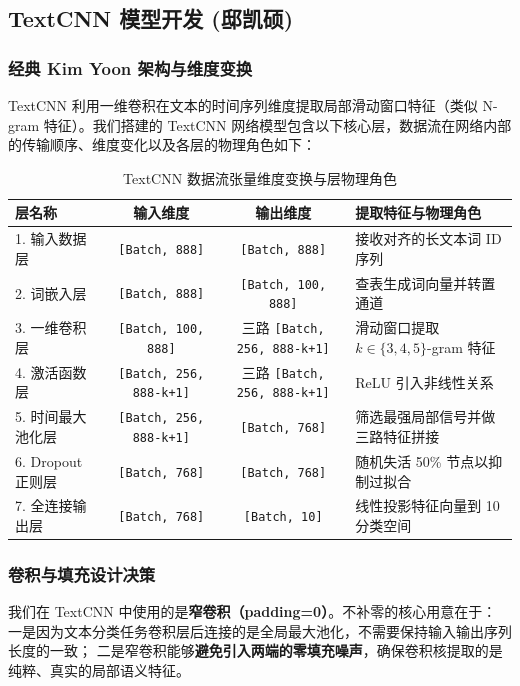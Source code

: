 \documentclass[UTF8,a4paper,11pt]{ctexart}
\begin{document}
\subsection{TextCNN 模型开发 (邸凯硕)}

\subsubsection{经典 Kim Yoon 架构与维度变换}
TextCNN 利用一维卷积在文本的时间序列维度提取局部滑动窗口特征（类似 N-gram 特征）。我们搭建的 TextCNN 网络模型包含以下核心层，数据流在网络内部的传输顺序、维度变化以及各层的物理角色如下：

\begin{table}[htbp]
\centering
\caption{TextCNN 数据流张量维度变换与层物理角色}
\label{tab:textcnn_dim}
\begin{tabular}{lccl}
\toprule
层名称 & 输入维度 & 输出维度 & 提取特征与物理角色 \\
\midrule
1. 输入数据层 & \texttt{[Batch, 888]} & \texttt{[Batch, 888]} & 接收对齐的长文本词 ID 序列 \\
2. 词嵌入层 & \texttt{[Batch, 888]} & \texttt{[Batch, 100, 888]} & 查表生成词向量并转置通道 \\
3. 一维卷积层 & \texttt{[Batch, 100, 888]} & 三路 \texttt{[Batch, 256, 888-k+1]} & 滑动窗口提取 $k \in \{3,4,5\}$-gram 特征 \\
4. 激活函数层 & \texttt{[Batch, 256, 888-k+1]} & 三路 \texttt{[Batch, 256, 888-k+1]} & ReLU 引入非线性关系 \\
5. 时间最大池化层 & \texttt{[Batch, 256, 888-k+1]} & \texttt{[Batch, 768]} & 筛选最强局部信号并做三路特征拼接 \\
6. Dropout 正则层 & \texttt{[Batch, 768]} & \texttt{[Batch, 768]} & 随机失活 50\% 节点以抑制过拟合 \\
7. 全连接输出层 & \texttt{[Batch, 768]} & \texttt{[Batch, 10]} & 线性投影特征向量到 10 分类空间 \\
\bottomrule
\end{tabular}
\end{table}

\subsubsection{卷积与填充设计决策}
我们在 TextCNN 中使用的是\textbf{窄卷积（padding=0）}。不补零的核心用意在于：
一是因为文本分类任务卷积层后连接的是全局最大池化，不需要保持输入输出序列长度的一致；
二是窄卷积能够\textbf{避免引入两端的零填充噪声}，确保卷积核提取的是纯粹、真实的局部语义特征。
\end{document}
